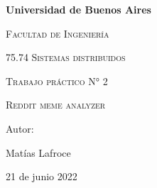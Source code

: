 \documentclass[12pt, a4paper]{article}
\begin{document}
\begin{titlepage}
	\centering
	\vspace{1cm}
	{\bfseries\LARGE Universidad de Buenos Aires \par}
	{\scshape\Large Facultad de Ingeniería\par}
	\vspace{3cm}
	{\scshape\Large 75.74 Sistemas distribuidos\par}
	\vspace{3cm}
	{\scshape\Huge Trabajo práctico N° 2 \par}
	{\scshape\Huge Reddit meme analyzer \par}
	\vfill
	{\Large Autor: \par}
	{\Large Matías Lafroce \par}
	\vfill
	{\Large 21 de junio 2022 \par}
\end{titlepage}

\tableofcontents


\end{document}
